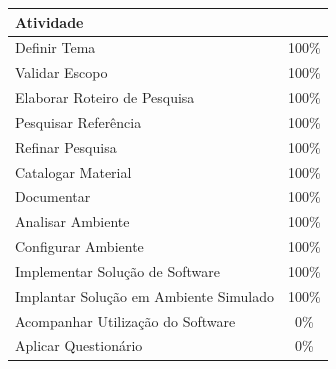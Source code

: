 \begin{table}[h!]
\centering
\label{table_status}
\begin{tabular}{lc}
\rowcolor[HTML]{9A0000} 
{\color[HTML]{FFFFFF} \textbf{Atividade}} & \multicolumn{1}{l}{\cellcolor[HTML]{9A0000}{\color[HTML]{FFFFFF} \textbf{Status}}} \\ \hline
Definir Tema                              & 100\%                                                                              \\ \hline
Validar Escopo                            & 100\%                                                                              \\ \hline
Elaborar Roteiro de Pesquisa              & 100\%                                                                              \\ \hline
Pesquisar Referência                      & 100\%                                                                              \\ \hline
Refinar Pesquisa                          & 100\%                                                                              \\ \hline
Catalogar Material                        & 100\%                                                                              \\ \hline
Documentar                                & 100\%                                                                               \\ \hline
Analisar Ambiente                         & 100\%                                                                               \\ \hline
Configurar Ambiente                       & 100\%                                                                                \\ \hline
Implementar Solução de Software           & 100\%                                                                                \\ \hline
Implantar Solução em Ambiente Simulado    & 100\%                                                                                \\ \hline
Acompanhar Utilização do Software         & 0\%                                                                                \\ \hline
Aplicar Questionário                      & 0\%                                                                                \\ \hline
\end{tabular}
\end{table}


